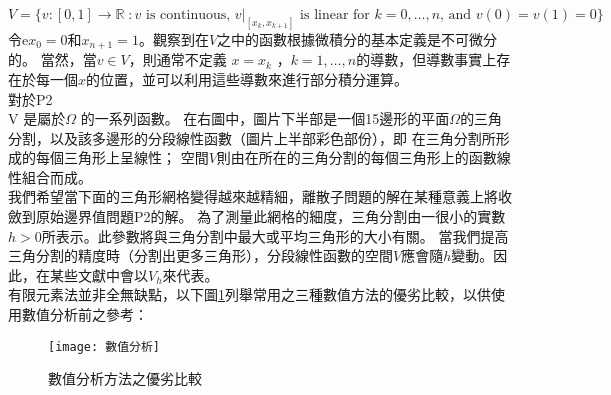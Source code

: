 \begin{itemize}
$ {\displaystyle V=\{v:[0,1]\rightarrow \mathbb {R} \;:v{\mbox{ is continuous, }}v|_{[x_{k},x_{k+1}]}{\mbox{ is linear for }}k=0,\dots ,n{\mbox{, and }}v(0)=v(1)=0\}}$\\

\qquad 令e$ x_0=0 $和$ {\displaystyle x_{n+1}=1}$。觀察到在$ V $之中的函數根據微積分的基本定義是不可微分的。 當然，當$v \in V$，則通常不定義 $ {\displaystyle x=x_{k}}$ ，${\displaystyle k=1,\ldots ,n}$的導數，但導數事實上存在於每一個$ x$的位置，並可以利用這些導數來進行部分積分運算。 \\

對於P2\\

\qquad V 是屬於$ \Omega$ 的一系列函數。 在右圖中，圖片下半部是一個15邊形的平面$ \Omega $的三角分割，以及該多邊形的分段線性函數（圖片上半部彩色部份），即 在三角分割所形成的每個三角形上呈線性； 空間$ V$則由在所在的三角分割的每個三角形上的函數線性組合而成。\\


\qquad 我們希望當下面的三角形網格變得越來越精細，離散子問題的解在某種意義上將收斂到原始邊界值問題P2的解。 為了測量此網格的細度，三角分割由一很小的實數 $ {\displaystyle h>0}$所表示。此參數將與三角分割中最大或平均三角形的大小有關。 當我們提高三角分割的精度時（分割出更多三角形），分段線性函數的空間$ V$應會隨$ h$變動。因此，在某些文獻中會以$V_{h}$來代表。 \\

\qquad 有限元素法並非全無缺點，以下圖\ref{2.90}列舉常用之三種數值方法的優劣比較，以供使用數值分析前之參考：\\
\begin{figure}[hbt!]
\begin{center}
\texttt{[image: 數值分析]}
\caption{\Large 數值分析方法之優劣比較}\label{2.90}
\end{center}
\end{figure}
\\
\end{itemize}
\newpage